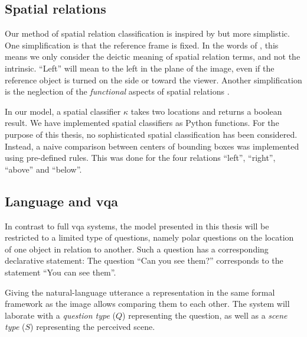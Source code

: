 \subsection{Spatial relations}
\label{sec:method-spatrel}

Our method of spatial relation classification is inspired by \cite{ttrspat} but more simplistic.
One simplification is that the reference frame is fixed.
In the words of \cite{Garnhamunifiedtheorymeaning1989}, this means we only consider the deictic meaning of spatial relation terms, and not the intrinsic.
``Left'' will mean to the left in the plane of the image, even if the reference object is turned on the side or toward the viewer.
Another simplification is the neglection of the \textit{functional} aspects of spatial relations \citep{CoventryInterplayGeometryFunction2001}.

In our model, a spatial classifier $\kappa$ takes two locations and returns a boolean result.
We have implemented spatial classifiers as Python functions.
For the purpose of this thesis, no sophisticated spatial classification has been considered.
Instead, a naive comparison between centers of bounding boxes was implemented using pre-defined rules.
This was done for the four relations ``left'', ``right'', ``above'' and ``below''.



\subsection{Language and \gls{vqa}}
\label{sec:languagevqa}

In contrast to full \gls{vqa} systems, the model presented in this thesis will be restricted to a limited type of questions, namely polar questions on the location of one object in relation to another.
Such a question has a corresponding declarative statement:
The question ``Can you see them?'' corresponds to the statement ``You can see them''.

Giving the natural-language utterance a representation in the same formal framework as the image allows comparing them to each other.
The system will laborate with a \textit{question type} ($Q$) representing the question, as well as a \textit{scene type} ($S$) representing the perceived scene.

